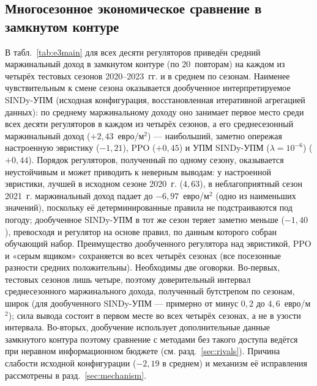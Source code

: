 \documentclass[12pt,a4paper,leqno]{article}
\begin{document}
\subsection{Многосезонное экономическое сравнение в замкнутом контуре}
\label{sec:e3}
В табл.~\ref{tab:e3main} для всех десяти регуляторов приведён средний маржинальный доход в замкнутом
контуре (по 20~повторам) на каждом из четырёх тестовых сезонов 2020--2023~гг. и в
среднем по сезонам. Наименее чувствительным к смене сезона оказывается дообученное
интерпретируемое SINDy-УПМ (исходная конфигурация, восстановленная итеративной агрегацией
данных): по среднему маржинальному доходу оно занимает первое место среди всех десяти регуляторов в
каждом из четырёх сезонов, а его среднесезонный маржинальный доход ($+2{,}43$~евро/м$^2$) —
наибольший, заметно опережая настроенную эвристику ($-1{,}21$), PPO ($+0{,}45$) и УПМ
SINDy-УПМ ($\lambda=10^{-6}$) ($+0{,}44$). Порядок регуляторов, полученный по одному сезону,
оказывается неустойчивым и может приводить к неверным выводам: у настроенной эвристики,
лучшей в исходном сезоне 2020~г. ($4{,}63$), в неблагоприятный сезон 2021~г. маржинальный доход
падает до $-6{,}97$~евро/м$^2$ (одно из наименьших значений), поскольку её детерминированные
правила не подстраиваются под погоду; дообученное SINDy-УПМ в тот же сезон теряет
заметно меньше ($-1{,}40$), превосходя и регулятор на основе правил, по данным которого собран обучающий набор.
Преимущество дообученного регулятора над эвристикой, PPO и «серым ящиком» сохраняется во
всех четырёх сезонах (все посезонные разности средних положительны). Необходимы две
оговорки. Во-первых, тестовых сезонов лишь четыре, поэтому доверительный интервал
среднесезонного маржинального дохода, полученный бутстрепом по сезонам, широк (для дообученного
SINDy-УПМ — примерно от минус $0{,}2$ до $4{,}6$~евро/м$^2$); сила вывода состоит в
первом месте во всех четырёх сезонах, а не в узости интервала. Во-вторых,
дообучение использует дополнительные данные замкнутого контура 
поэтому сравнение с методами без такого доступа ведётся при неравном
информационном бюджете (см. разд.~\ref{sec:rivals}). Причина слабости исходной
конфигурации ($-2{,}19$ в среднем) и механизм её исправления рассмотрены в
разд.~\ref{sec:mechanism}.
\end{document}
